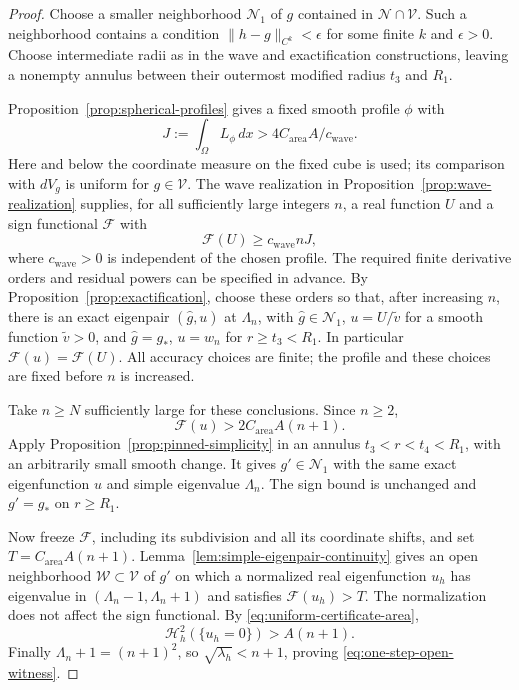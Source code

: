 \begin{proof}
Choose a smaller neighborhood $\mathcal N_1$ of $g$ contained in
$\mathcal N\cap\mathcal V$.  Such a neighborhood contains a condition
$\|h-g\|_{C^k}<\epsilon$ for some finite $k$ and $\epsilon>0$.
Choose intermediate radii as in the wave and exactification
constructions, leaving a nonempty annulus between their outermost
modified radius $t_3$ and $R_1$.

Proposition~\ref{prop:spherical-profiles} gives a fixed smooth profile
$\phi$ with
\[
 J:=\int_\Omega L_\phi\,dx
 >4C_{\mathrm{area}}A/c_{\mathrm{wave}}.
\]
Here and below the coordinate measure on the
fixed cube is used; its comparison with $dV_g$ is uniform for
$g\in\mathcal V$.  The wave realization in
Proposition~\ref{prop:wave-realization} supplies, for all sufficiently
large integers $n$, a real function $U$ and a sign functional
$\mathcal F$ with
\[
 \mathcal F(U)\ge c_{\mathrm{wave}}nJ,
\]
where $c_{\mathrm{wave}}>0$ is independent of the chosen profile.
The required finite derivative orders and residual powers can be
specified in advance.  By Proposition~\ref{prop:exactification},
choose these orders so that, after increasing $n$, there is an exact
eigenpair $(\widehat g,u)$ at $\Lambda_n$, with
$\widehat g\in\mathcal N_1$, $u=U/\widetilde v$ for a smooth
function $\widetilde v>0$, and $\widehat g=g_*$, $u=w_n$ for $r\ge t_3<R_1$.
In particular $\mathcal F(u)=\mathcal F(U)$.
All accuracy choices are finite; the profile and these choices are
fixed before $n$ is increased.

Take $n\ge N$ sufficiently large for these conclusions.  Since $n\ge2$,
\begin{equation}\label{eq:one-step-sign-threshold}
 \mathcal F(u)>2C_{\mathrm{area}}A(n+1).
\end{equation}
Apply Proposition~\ref{prop:pinned-simplicity} in an annulus
$t_3<r<t_4<R_1$, with an arbitrarily small smooth change.  It gives
$g'\in\mathcal N_1$ with the same exact eigenfunction $u$ and
simple eigenvalue $\Lambda_n$.  The sign bound is unchanged and
$g'=g_*$ on $r\ge R_1$.

Now freeze $\mathcal F$, including its subdivision and all its
coordinate shifts, and set
$T=C_{\mathrm{area}}A(n+1)$.
Lemma~\ref{lem:simple-eigenpair-continuity} gives an open
neighborhood $\mathcal W\subset\mathcal V$ of $g'$ on which a
normalized real eigenfunction $u_h$ has eigenvalue in
$(\Lambda_n-1,\Lambda_n+1)$ and satisfies
$\mathcal F(u_h)>T$.  The normalization does not affect the sign
functional.  By \eqref{eq:uniform-certificate-area},
\[
 \mathcal H_h^2(\{u_h=0\})>A(n+1).
\]
Finally $\Lambda_n+1=(n+1)^2$, so
$\sqrt{\lambda_h}<n+1$, proving
\eqref{eq:one-step-open-witness}.
\end{proof}

